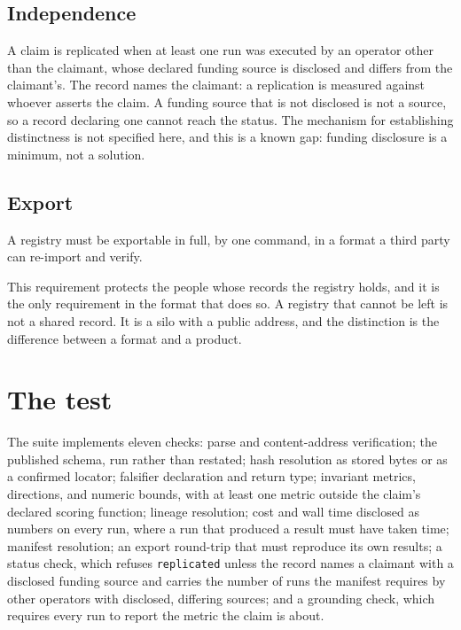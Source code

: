 \documentclass[11pt]{article}
\begin{document}
\subsection{Independence}

A claim is replicated when at least one run was executed by an operator other
than the claimant, whose declared funding source is disclosed and differs from
the claimant's. The record names the claimant: a replication is measured
against whoever asserts the claim. A funding source that is not disclosed is not
a source, so a record declaring one cannot reach the status. The mechanism
for establishing distinctness is not specified here, and this is a known gap:
funding disclosure is a minimum, not a solution.

\subsection{Export}

A registry must be exportable in full, by one command, in a format a third
party can re-import and verify.

This requirement protects the people whose records the registry holds, and it
is the only requirement in the format that does so. A registry that cannot be
left is not a shared record. It is a silo with a public address, and the
distinction is the difference between a format and a product.

\section{The test}

The suite implements eleven checks: parse and content-address verification;
the published schema, run rather than restated; hash resolution as stored
bytes or as a confirmed locator; falsifier declaration and return type;
invariant metrics, directions, and numeric bounds, with at least one metric
outside the claim's declared scoring function; lineage
resolution; cost and wall time disclosed as numbers on every run, where a run
that produced a result must have taken time; manifest
resolution; an export round-trip that must reproduce its own results; a
status check, which refuses \texttt{replicated} unless the record names a claimant with
a disclosed funding source and carries the number of runs the manifest requires
by other operators with disclosed, differing sources; and a grounding check,
which requires every run to report the metric the claim is about.
\end{document}
